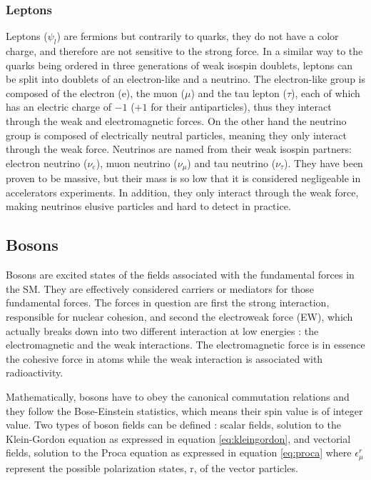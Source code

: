 \subsubsection{Leptons}

Leptons ($\psi_l$) are fermions but contrarily to quarks, they do not have a color charge, and therefore are not sensitive to the strong force. In a similar way to the quarks being ordered in three generations of weak isospin doublets, leptons can be split into doublets of an electron-like and a neutrino. The electron-like group is composed of the electron (e), the muon ($\mu$) and the tau lepton ($\tau$), each of which has an electric charge of $-1$ ($+1$ for their antiparticles), thus they interact through the weak and electromagnetic forces. On the other hand the neutrino group is composed of electrically neutral particles, meaning they only interact through the weak force. Neutrinos are named from their weak isospin partners: electron neutrino ($\nu_e$), muon neutrino ($\nu_{\mu}$) and tau neutrino ($\nu_{\tau}$). They have been proven to be massive, but their mass is so low that it is considered negligeable in accelerators experiments. In addition, they only interact through the weak force, making neutrinos elusive particles and hard to detect in practice.

\subsection{Bosons}

Bosons are excited states of the fields associated with the fundamental forces in the SM. They are effectively considered carriers or mediators for those fundamental forces. The forces in question are first the strong interaction, responsible for nuclear cohesion, and second the electroweak force (EW), which actually breaks down into two different interaction at low energies : the electromagnetic and the weak interactions. The electromagnetic force is in essence the cohesive force in atoms while the weak interaction is associated with radioactivity.

Mathematically, bosons have to obey the canonical commutation relations and they follow the Bose-Einstein statistics, which means their spin value is of integer value. Two types of boson fields can be defined : scalar fields, solution to the Klein-Gordon equation as expressed in equation \ref{eq:kleingordon}, and vectorial fields, solution to the Proca equation as expressed in equation \ref{eq:proca} where $\epsilon_{\mu}^{r}$ represent the possible polarization states, r, of the vector particles.

